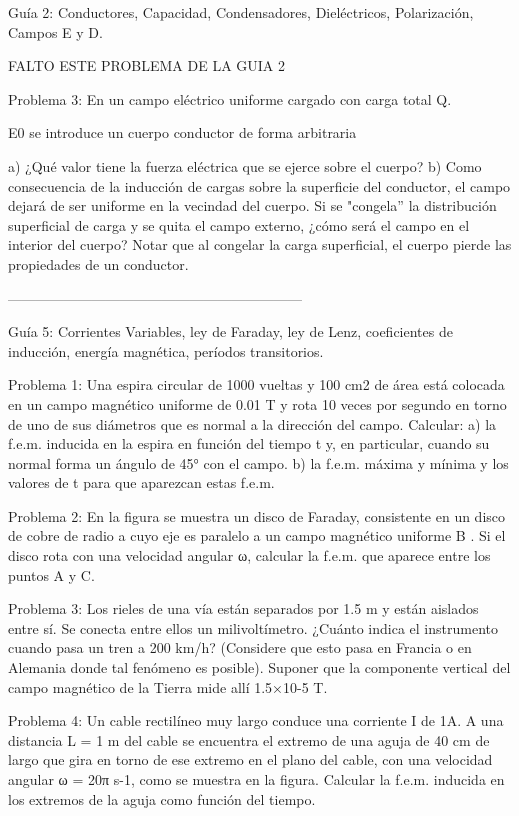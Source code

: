 
Guía 2: Conductores, Capacidad, Condensadores, Dieléctricos, Polarización, Campos E y D.

FALTO ESTE PROBLEMA DE LA GUIA 2

 
Problema 3:
En un campo eléctrico uniforme cargado con carga total Q.

E0    se introduce un cuerpo conductor de forma arbitraria
 
a)	¿Qué valor tiene la fuerza eléctrica que se ejerce sobre el cuerpo?
b)	Como consecuencia de la inducción de cargas sobre la superficie del conductor, el campo dejará de ser uniforme en la vecindad del cuerpo. Si se "congela'' la distribución superficial de carga y se quita el campo externo, ¿cómo será el campo en el interior del cuerpo? Notar que al congelar la carga superficial, el cuerpo pierde las propiedades de un conductor.


---------------------------------------------------------------


Guía 5: Corrientes Variables, ley de Faraday, ley de Lenz, coeficientes de inducción, energía magnética, períodos transitorios.

Problema 1:
Una espira circular de 1000 vueltas y 100 cm2 de área está colocada en un campo magnético uniforme de 0.01 T y rota 10 veces por segundo en torno de uno de sus diámetros que es normal a la dirección del campo. Calcular:
a)	la f.e.m. inducida en la espira en función del tiempo t y, en particular, cuando su normal forma un ángulo de 45° con el campo.
b)	la f.e.m. máxima y mínima y los valores de t para que aparezcan estas f.e.m.



Problema 2:
En la figura se muestra un disco de Faraday, consistente en un disco de cobre de radio a cuyo eje es paralelo a un campo magnético uniforme B .
Si  el  disco  rota  con  una  velocidad  angular  ω,  calcular  la  f.e.m.  que
aparece entre los puntos A y C.



Problema 3:
Los rieles de una vía están separados por 1.5 m y están aislados entre sí. Se conecta entre ellos un milivoltímetro. ¿Cuánto indica el instrumento cuando pasa un tren a 200 km/h? (Considere que esto pasa en Francia o en Alemania donde tal fenómeno es posible). Suponer que la componente vertical del campo magnético de la Tierra mide allí  1.5×10-5 T.



Problema 4:
Un cable rectilíneo muy largo conduce una corriente I de 1A. A una distancia L = 1 m del cable se encuentra el extremo de una aguja de 40 cm de largo que gira en torno de ese extremo en el plano del cable, con una velocidad angular ω = 20π s-1, como se muestra en la figura. Calcular la f.e.m. inducida en los extremos de la aguja como función del tiempo.



